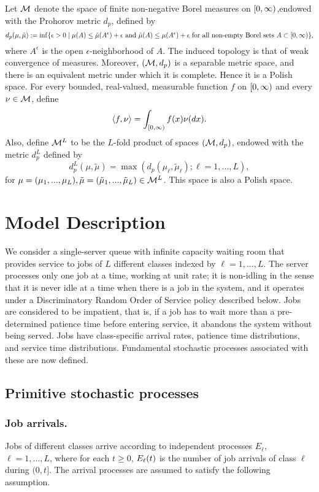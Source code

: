 \documentclass{article}
\numberwithin{equation}{section}
\begin{document}
Let $\mathcal{M}$ denote the space of finite non-negative Borel measures on $[0,\infty)$,endowed with  the Prohorov metric $d_p$, defined by
\[
d_p(\mu,\tilde\mu) := \inf\{ \epsilon>0 \; | \; \mu(A)\leq \tilde\mu(A^\epsilon)+\epsilon\text{ and }\tilde\mu(A)\leq \mu(A^\epsilon)+\epsilon\text{ for all non-empty Borel sets } A\subset[0,\infty)\},
\]
where $A^\epsilon$ is the open $\epsilon$-neighborhood of $A$. 
The induced topology is that of weak convergence of measures. Moreover, $(\mathcal{M}, d_p)$ is a separable metric space, and there is an equivalent metric
under which it is complete. Hence it is a Polish space.
For every bounded, real-valued, measurable function $f$ on $[0,\infty)$ and every $\nu\in\mathcal{M}$, define
\[
\langle f ,\nu \rangle = \int_{[0,\infty)}f(x)\nu(dx).
\]
Also, define $\mathcal{M}^L$ to be the $L$-fold product of spaces $(\mathcal{M},d_p)$, endowed with the metric $d_p^L$ defined by 
\[
d_p^L(\mu,\tilde\mu)=\max(d_p(\mu_\ell,\tilde\mu_\ell);\ell=1,...,L),
\]
for $\mu=(\mu_1,...,\mu_L),\tilde\mu=(\tilde\mu_1,...,\tilde\mu_L)\in\mathcal{M}^L$. This space is also a Polish space.



\section{Model Description}

We consider a single-server queue with infinite capacity waiting room that provides service to jobs of $L$ different classes indexed by $\ell=1,...,L$. The server processes only one job at a time, working at unit rate; it is non-idling in the sense that it is never idle at a time when there is a job in the system, and it operates under a Discriminatory Random Order of Service policy described below. Jobs are considered to be impatient, that is, if a job has to wait more than a pre-determined patience time before entering service, it abandons the system without being served. Jobs have class-specific arrival rates, patience time distributions, and service time distributions. Fundamental stochastic processes associated with these are now defined.


\subsection{Primitive stochastic processes}\label{sec_model}


\subsubsection*{Job arrivals.}
Jobs of different classes arrive according to independent processes $E_\ell$, $\ell=1,...,L$, where for each $t\geq0$, $E_\ell(t)$ is the number of job arrivals of class $\ell$ during $(0,t]$. The arrival processes are assumed to satisfy the following assumption.
\end{document}
